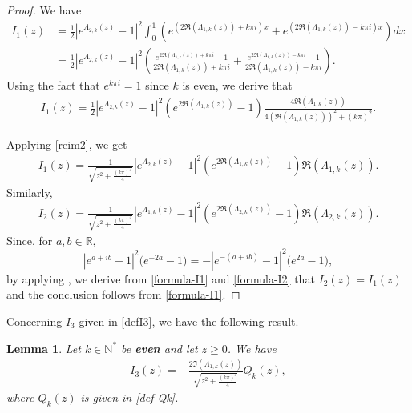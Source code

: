 \documentclass[11pt, reqno]{amsart}
\theoremstyle{plain}
\newtheorem{lemma}[thm]{Lemma}
\numberwithin{equation}{section}
\newcommand{\mR}{\mathbb{R}}
\newcommand{\mN}{\mathbb{N}}
\begin{document}
\begin{proof}
We have
    \begin{align*}
        I_1(z)        &= \frac{1}{2} \left|e^{\Lambda_{2,k}(z)} - 1 \right|^2 \int_0^1 \left( e^{ \left(2\Re (\Lambda_{1,k}(z)) + k \pi i \right)x } + e^{ \left(2\Re(\Lambda_{1,k}(z)) - k \pi i \right) x} \right) dx \nonumber \\
        &= \frac{1}{2} \left|e^{\Lambda_{2,k}(z)} - 1 \right|^2 \left(\frac{e^{2\Re (\Lambda_{1,k}(z)) + k \pi i} - 1}{2\Re (\Lambda_{1,k}(z)) + k \pi i} + \frac{e^{2\Re(\Lambda_{1,k}(z)) - k \pi i} - 1}{2\Re (\Lambda_{1,k}(z)) - k \pi i}\right).
    \end{align*}
Using the fact that $e^{k \pi i} = 1$ since $k$ is even, we derive that 
  \begin{align*}
        I_1(z)        =  \frac{1}{2} \left|e^{\Lambda_{2,k}(z)} - 1 \right|^2 \left(e^{2\Re (\Lambda_{1,k}(z))} - 1 \right) \frac{4\Re (\Lambda_{1,k}(z))}{4 (\Re(\Lambda_{1,k}(z)))^2 + (k \pi)^2}. 
    \end{align*}
    
  

   Applying \eqref{reim2}, we get
    \begin{align}	\label{formula-I1}
	I_1(z) =      \frac{1}{\sqrt{z^2 + \frac{(k \pi)^4}{4}}}\left|e^{\Lambda_{2,k}(z)} - 1 \right|^2 \left(e^{2\Re (\Lambda_{1,k}(z))} - 1 \right)\Re(\Lambda_{1,k}(z)).
     \end{align}     
    Similarly,
   \begin{align}   	\label{formula-I2}
        I_2(z) = \frac{1}{\sqrt{z^2 + \frac{(k \pi)^4}{4}}}\left|e^{\Lambda_{1,k}(z)} - 1 \right|^2 \left(e^{2\Re (\Lambda_{2,k}(z))} - 1 \right)\Re(\Lambda_{2,k}(z)).
   \end{align}
Since, for $a, b \in \mR$, 
$$
|e^{a + i b} - 1|^2 \Big( e^{- 2 a} - 1 \Big) = - |e^{-(a + i b)} - 1|^2 \Big( e^{2 a} - 1 \Big), 
$$   
by applying , we derive from \eqref{formula-I1} and \eqref{formula-I2} that $I_2(z) = I_1(z)$ and the conclusion follows from \eqref{formula-I1}. 
\end{proof}

Concerning $I_3$ given in  \eqref{defI3}, we have the following result. 

\begin{lemma} \label{lem-I3} Let $k \in \mN^*$ be {\bf even} and let $z \ge 0$. We have
\begin{align}\label{I3}  
I_3(z) = - \frac{2  \Im (\Lambda_{1,k}(z)) }{\sqrt{ z^2 + \frac{(k \pi)^4}{4} }} Q_k(z),  
\end{align}
where  $Q_k(z)$ is given in \eqref{def-Qk}.
\end{lemma}
\end{document}
